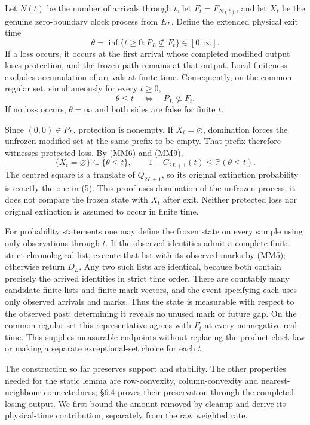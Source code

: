 \documentclass[
  11pt,
  a4paper,
]{article}
\begin{document}
Let \(N(t)\) be the number of arrivals through \(t\), let
\(F_t=F_{N(t)}\), and let \(X_t\) be the genuine zero-boundary clock
process from \(E_L\). Define the extended physical exit time \[
\theta=\inf\{t\geq0:P_L\not\subseteq F_t\}\in[0,\infty].
\tag{MM8}
\] If a loss occurs, it occurs at the first arrival whose completed
modified output loses protection, and the frozen path remains at that
output. Local finiteness excludes accumulation of arrivals at finite
time. Consequently, on the common regular set, simultaneously for every
\(t\geq0\), \[
\theta\leq t\quad\Longleftrightarrow\quad P_L\not\subseteq F_t.
\tag{MM9}
\] If no loss occurs, \(\theta=\infty\) and both sides are false for
finite \(t\).

Since \((0,0)\in P_L\), protection is nonempty. If \(X_t=\varnothing\),
domination forces the unfrozen modified set at the same prefix to be
empty. That prefix therefore witnesses protected loss. By (MM6) and
(MM9), \[
\{X_t=\varnothing\}\subseteq\{\theta\leq t\},
\qquad
1-C_{2L+1}(t)\leq\mathbb P(\theta\leq t).
\tag{MM10}
\] The centred square is a translate of \(Q_{2L+1}\), so its original
extinction probability is exactly the one in (5). This proof uses
domination of the unfrozen process; it does not compare the frozen state
with \(X_t\) after exit. Neither protected loss nor original extinction
is assumed to occur in finite time.

For probability statements one may define the frozen state on every
sample using only observations through \(t\). If the observed identities
admit a complete finite strict chronological list, execute that list
with its observed marks by (MM5); otherwise return \(D_L\). Any two such
lists are identical, because both contain precisely the arrived
identities in strict time order. There are countably many candidate
finite lists and finite mark vectors, and the event specifying each uses
only observed arrivals and marks. Thus the state is measurable with
respect to the observed past: determining it reveals no unused mark or
future gap. On the common regular set this representative agrees with
\(F_t\) at every nonnegative real time. This supplies measurable
endpoints without replacing the product clock law or making a separate
exceptional-set choice for each \(t\).

The construction so far preserves support and stability. The other
properties needed for the static lemma are row-convexity,
column-convexity and nearest-neighbour connectedness; §6.4 proves their
preservation through the completed losing output. We first bound the
amount removed by cleanup and derive its physical-time contribution,
separately from the raw weighted rate.
\end{document}
